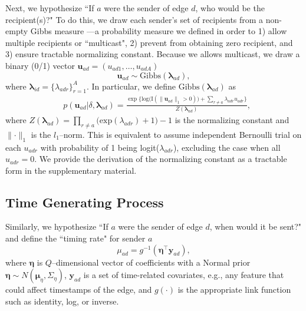 \documentclass[12pt]{article}
\begin{document}
Next, we hypothesize ``If $a$ were the sender of edge $d$, who would be the recipient(s)?" To do this, we draw each sender's set of recipients from a non-empty Gibbs measure \cite{fellows2017removing}---a probability measure we defined in order to 1) allow multiple recipients or ``multicast", 2) prevent from obtaining zero recipient, and 3) ensure tractable normalizing constant. Because we allows multicast, we draw a binary (0/1) vector $\boldsymbol{u}_{ad}= (u_{ad1},
\ldots, u_{adA})$
\begin{equation} \boldsymbol{u}_{ad}  \sim
\mbox{Gibbs}(\boldsymbol{\lambda}_{ad}),
\end{equation}
where $\boldsymbol{\lambda}_{id}= \{\lambda_{adr}\}_{r=1}^A$. In particular, we define $\mbox{Gibbs}(\boldsymbol{\lambda}_{ad})$ as
\begin{equation}
\begin{aligned}
&p(\boldsymbol{u}_{ad}|\delta, \boldsymbol{\lambda}_{ad}) = \frac{\exp\Big\{\mbox{log}\big(\text{I}( \lVert \boldsymbol{u}_{ad}\rVert_1 > 0 )\big) + \sum_{r\neq a} \lambda_{adr}u_{adr}\Big\}}{Z(\boldsymbol{\lambda}_{ad})} ,
\end{aligned}
\label{eqn:Gibbs}
\end{equation}
where $Z(\boldsymbol{\lambda}_{ad})= \prod_{r \neq a} \big(\mbox{exp}(\lambda_{adr}) + 1\big)-1$ is the normalizing constant and $\lVert \cdot \rVert_1$ is the $l_1$--norm. This is equivalent to assume independent Bernoulli trial on each $u_{adr}$ with probability of 1 being logit($\lambda_{adr}$), excluding the case when all $u_{adr}=0$. We provide the derivation of the normalizing constant as a tractable form in the supplementary material. 


\subsection{Time Generating Process}\label{subsec:Time}
Similarly, we hypothesize ``If $a$ were the sender of edge $d$, when would it be sent?" and define the ``timing rate" for sender $a$
\begin{equation}
\mu_{ad} = g^{-1}(\boldsymbol{\eta}^\top \boldsymbol{y}_{ad}),
\end{equation}
where $\boldsymbol{\eta}$ is $Q$--dimensional vector of coefficients with a Normal prior $\boldsymbol{\eta} \sim N(\boldsymbol{\mu}_\eta,\Sigma_\eta)$, $\boldsymbol{y}_{ad}$ is a set of time-related covariates, e.g., any feature that could affect timestamps of the edge, and $g(\cdot)$ is the appropriate link function such as identity, log, or inverse. 
\end{document}
